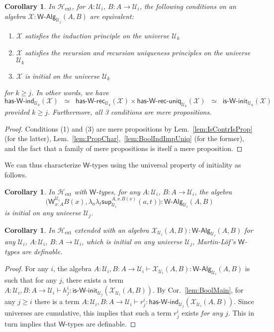 \documentclass[reqno,10pt,a4paper,oneside]{amsart}
\newcommand{\X}{\mathcal{X}}
\newcommand{\lam}[1]{\lambda_{#1}}
\newcommand{\W}{\mathsf{W}}
\newcommand{\wsup}{\mathsf{sup}}
\newcommand{\UU}{\mathcal{U}}
\newcommand{\WAlg}{\mathsf{W}\text{-}\mathsf{Alg}}
\newcommand{\HasWRec}{\mathsf{has}\text{-}\mathsf{W}\text{-}\mathsf{rec}}
\newcommand{\HasWInd}{\mathsf{has}\text{-}\mathsf{W}\text{-}\mathsf{ind}}
\newcommand{\HasWRecUniq}{\mathsf{has}\text{-}\mathsf{W}\text{-}\mathsf{rec}\text{-}\mathsf{uniq}}
\newcommand{\IsWInit}{\mathsf{is}\text{-}\mathsf{\W}\text{-}\mathsf{init}}
\newcommand{\Hext}{\mathcal{H}_{\mathrm{ext}}}
\numberwithin{equation}{section}
\theoremstyle{mythm}
\newtheorem{corollary}[theorem]{Corollary}
\theoremstyle{mydef}
\theoremstyle{myrmk}
\begin{document}
\begin{corollary}\label{lem:WMain}
In $\Hext$, for $A:\UU_i$, $B : A \to \UU_i$, the following conditions on an algebra $\X : \WAlg_{\UU_j}(A,B)$ are equivalent:
\begin{enumerate}
\item $\X$ satisfies the induction principle on the universe $\UU_k$
\item $\X$ satisfies the recursion and recursion uniqueness principles on the universe $\UU_k$
\item $\X$ is initial on the universe $\UU_k$  
\end{enumerate}
for $k \geq j$. In other words, we have \[ \HasWInd_{\UU_k}(\X)  \;\; \simeq \;\; \HasWRec_{\UU_k}(\X) \times \HasWRecUniq_{\UU_k}(\X) \;\; \simeq \;\; \IsWInit_{\UU_k}(\X) \]
provided $k \geq j$. Furthermore, all 3 conditions are mere propositions.
\end{corollary}
\begin{proof}
Conditions (1) and (3) are mere propositions by Lem.~\ref{lem:IsContrIsProp} (for the latter), Lem.~\ref{lem:PropChar},~\ref{lem:BoolIndImpUniq} (for the former), and the fact that a family of mere propositions is itself a mere proposition.
\end{proof}

We can thus characterize $\W$-types using the universal property of initiality as follows.
\begin{corollary}\label{lem:WInit}
In $\Hext$ with $\W$-types, for any $A:\UU_i$, $B : A \to \UU_i$, the algebra \[\Big(\W^{\UU_i}_{x:A}B(x),\lam{a}\lam{t} \wsup_{\UU_i}^{A,x.B(x)}(a,t) \Big) : \WAlg_{\UU_i}(A,B)\] is initial on any universe $\UU_j$.
\end{corollary}

\begin{corollary}\label{lem:WChar}
In $\Hext$ extended with an algebra $\X_{\UU_i}(A,B) : \WAlg_{\UU_i}(A,B)$ for any $\UU_i$, $A : \UU_i$, $B : A \to \UU_i$, which is initial on any universe $\UU_j$, Martin-L{\"o}f's $\W$-types are definable.
\end{corollary}
\begin{proof}
For any $i$, the algebra $A:\UU_i,B:A\to \UU_i \vdash \X_{\UU_i}(A,B) : \WAlg_{\UU_i}(A,B)$ is such that for any $j$, there exists a term $A:\UU_i,B:A\to \UU_i \vdash h^i_j  : \IsWInit_{\UU_j}(\X_{\UU_i}(A,B))$. By Cor.~\ref{lem:BoolMain}, for any $j \geq i$ there is a term $A:\UU_i,B:A\to \UU_i \vdash r^i_j : \HasWInd_{\UU_j}(\X_{\UU_i}(A,B))$. Since universes are cumulative, this implies that such a term $r^i_j$ exists \emph{for any $j$}. This in turn implies that $\W$-types are definable.
\end{proof}
\end{document}
